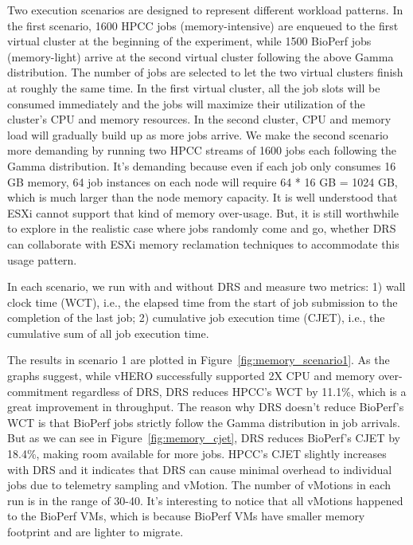 Two execution scenarios are designed to represent different workload patterns. In the first scenario, 1600 HPCC jobs (memory-intensive) are enqueued to the first virtual cluster at the beginning of the experiment, while 1500 BioPerf jobs (memory-light) arrive at the second virtual cluster following the above Gamma distribution. The number of jobs are selected to let the two virtual clusters finish at roughly the same time. In the first virtual cluster, all the job slots will be consumed immediately and the jobs will maximize their utilization of the cluster's CPU and memory resources. In the second cluster, CPU and memory load will gradually build up as more jobs arrive. 
We make the second scenario more demanding by running two HPCC streams of 1600 jobs each following the Gamma distribution. 
It's demanding because even if each job only consumes 16 GB memory, 64 job instances on each node will require 64 * 16 GB = 1024 GB, which is much larger than the node memory capacity. It is well understood that ESXi cannot support that kind of memory over-usage. But, it is still worthwhile to explore in the realistic case where jobs randomly come and go, whether DRS can collaborate with ESXi memory reclamation techniques to accommodate this usage pattern. 

In each scenario, we run with and without DRS and measure two metrics: 1) wall clock time (WCT), i.e., the elapsed time from the start of job submission to the completion of the last job; 2) cumulative job execution time (CJET), i.e., the cumulative sum of all job execution time. 

The results in scenario 1 are plotted in Figure~\ref{fig:memory_scenario1}. As the graphs suggest, while vHERO successfully supported 2X CPU and memory over-commitment regardless of DRS, DRS reduces HPCC's WCT by 11.1\%, which is a great improvement in throughput. 
The reason why DRS doesn't reduce BioPerf's WCT is that BioPerf jobs strictly follow the Gamma distribution in job arrivals.
But as we can see in Figure~\ref{fig:memory_cjet}, DRS reduces BioPerf's CJET by 18.4\%, making room available for more jobs. HPCC's CJET slightly increases with DRS and it indicates that DRS can cause minimal overhead to individual jobs due to telemetry sampling and vMotion. 
The number of vMotions in each run is in the range of 30-40. It's interesting to notice that all vMotions happened to the BioPerf VMs, which is because BioPerf VMs have smaller memory footprint and are lighter to migrate.

